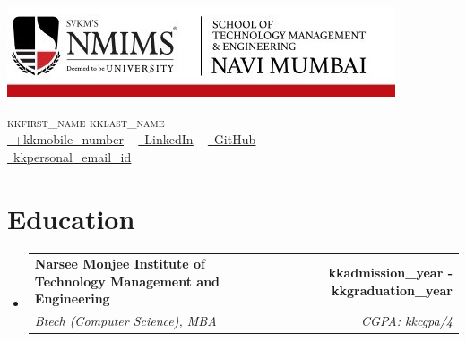 \documentclass[letterpaper,11pt]{article}
\makeatletter
\newcommand{\resumeSubheading}[4]{
  \vspace{-2pt}\item
    \begin{tabular*}{1.0\textwidth}[t]{l@{\extracolsep{\fill}}r}
      \textbf{#1} & \textbf{\small #2} \\
      \textit{\small#3} & \textit{\small #4} \\
    \end{tabular*}\vspace{-7pt}
}
\newcommand{\resumeSubHeadingListStart}{\begin{itemize}[leftmargin=0.0in, label={}]}
\newcommand{\resumeSubHeadingListEnd}{\end{itemize}}
\makeatother
\begin{document}
\begin{center}
\begin{minipage}{0.55\textwidth}
\includegraphics[scale=3]{nmims_logo.jpg}
\end{minipage}
\begin{minipage}{0.4\textwidth}
\raggedright
    {\huge \scshape kkfirst_name kklast_name } \\
    \vspace{1pt}
   { 
    \href{tel:+kkmobile_number}{\small \raisebox{-0.1\height}\faPhone\ \underline{+kkmobile_number}} ~
    \href{kklinkedin_profile_url}{\raisebox{-0.2\height}\faLinkedin\ \underline{LinkedIn}}  ~
    \href{kkgit_profile_url}{\raisebox{-0.2\height}\faGithub\ \underline{GitHub}}\\
    \href{mailto:kkpersonal_email_id}{\raisebox{-0.2\height}\faEnvelope\  \underline{kkpersonal_email_id}}\\
    }
\end{minipage}
\vspace{4pt}

    \vspace{-8pt}
\end{center}


\section{Education}
  \resumeSubHeadingListStart
    \resumeSubheading
      {Narsee Monjee Institute of Technology Management and  Engineering}{kkadmission_year - kkgraduation_year}
      {Btech (Computer Science), MBA}{CGPA: kkcgpa/4}
  \resumeSubHeadingListEnd
\end{document}
